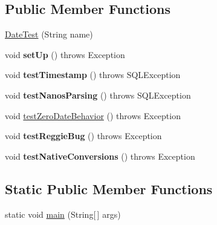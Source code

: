 \subsection*{Public Member Functions}
\begin{DoxyCompactItemize}
\item 
\mbox{\hyperlink{classtestsuite_1_1simple_1_1_date_test_a60a505c566e773c02bbbb3110db9f086}{Date\+Test}} (String name)
\item 
\mbox{\label{classtestsuite_1_1simple_1_1_date_test_a647fe9ec63530089f263b6e3b11c9416}} 
void {\bfseries set\+Up} ()  throws Exception 
\item 
\mbox{\label{classtestsuite_1_1simple_1_1_date_test_ad5650d68e2ad8f8299ee50582df96fbd}} 
void {\bfseries test\+Timestamp} ()  throws S\+Q\+L\+Exception 
\item 
\mbox{\label{classtestsuite_1_1simple_1_1_date_test_a8ff33660e5f3bef72c6e40dafff29179}} 
void {\bfseries test\+Nanos\+Parsing} ()  throws S\+Q\+L\+Exception 
\item 
void \mbox{\hyperlink{classtestsuite_1_1simple_1_1_date_test_a65e40a7db246ac9e6d412004a72e4bd4}{test\+Zero\+Date\+Behavior}} ()  throws Exception 
\item 
\mbox{\label{classtestsuite_1_1simple_1_1_date_test_a68b7b47868eba16b30f704412bff26a2}} 
void {\bfseries test\+Reggie\+Bug} ()  throws Exception 
\item 
\mbox{\label{classtestsuite_1_1simple_1_1_date_test_a77231bba7d456a9a577452a353b9348e}} 
void {\bfseries test\+Native\+Conversions} ()  throws Exception 
\end{DoxyCompactItemize}
\subsection*{Static Public Member Functions}
\begin{DoxyCompactItemize}
\item 
static void \mbox{\hyperlink{classtestsuite_1_1simple_1_1_date_test_a1d2bf67257401c0087fbe82d7e7ef0ff}{main}} (String\mbox{[}$\,$\mbox{]} args)
\end{DoxyCompactItemize}
